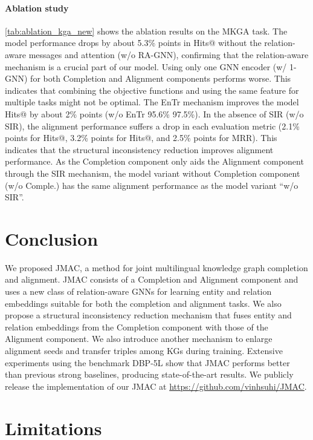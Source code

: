 \documentclass[11pt]{article}
\begin{document}
\paragraph{Ablation study} \autoref{tab:ablation_kga_new} shows the ablation results on the MKGA task. 
The model performance drops by about 5.3\% points in Hits@ without the relation-aware messages and attention (w/o RA-GNN), confirming that the relation-aware mechanism is a crucial part of our model. 
Using only one GNN encoder (w/ 1-GNN) for both Completion and Alignment components  performs worse. This indicates that combining the objective functions and using the same feature for multiple tasks might not be optimal. 
The EnTr mechanism improves the model Hits@ by about 2\% points (w/o EnTr 95.6\%   97.5\%). 
In the absence of SIR (w/o SIR), the alignment performance suffers a drop in each evaluation metric (2.1\% points for Hits@, 3.2\% points for Hits@, and 2.5\% points for MRR). This indicates that the structural inconsistency reduction improves alignment performance. 
As the Completion component only aids the Alignment component through the SIR mechanism, the model variant without Completion component (w/o Comple.)  has the same alignment performance as the model variant ``w/o SIR''. 





\section{Conclusion}

We proposed JMAC, a method for joint multilingual knowledge graph completion and alignment. JMAC consists of a Completion and Alignment component and uses a new class of relation-aware GNNs for learning entity and relation embeddings suitable for both the completion and alignment tasks. We also propose a structural inconsistency reduction mechanism that fuses entity and relation embeddings from the Completion component with those of the Alignment component. We also introduce another mechanism to enlarge alignment seeds and transfer triples among KGs during training. Extensive experiments using the benchmark DBP-5L \cite{chen2020multilingual} show that JMAC performs better than previous strong baselines, producing state-of-the-art results. We publicly release the implementation of our JMAC at \url{https://github.com/vinhsuhi/JMAC}.



\section*{Limitations}
\end{document}
